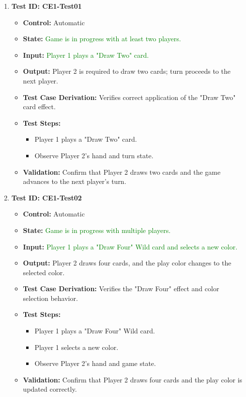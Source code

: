 \documentclass[12pt]{article}
\newcommand{\added}[1]{\textcolor{green}{#1}}
\begin{document}
\begin{enumerate}
    \item \textbf{Test ID: CE1-Test01}
    \begin{itemize}
        \item \textbf{Control:} Automatic
        \item \textbf{State:} \added{Game is in progress with at least two players.}
        \item \textbf{Input:} \added{Player 1 plays a "Draw Two" card.}
        \item \textbf{Output:} Player 2 is required to draw two cards; turn proceeds to the next player.
        \item \textbf{Test Case Derivation:} Verifies correct application of the "Draw Two" card effect.
        \item \textbf{Test Steps:}
        \begin{itemize}
            \item Player 1 plays a "Draw Two" card.
            \item Observe Player 2's hand and turn state.
        \end{itemize}
        \item \textbf{Validation:} Confirm that Player 2 draws two cards and the game advances to the next player's turn.
    \end{itemize}

    \item \textbf{Test ID: CE1-Test02}
    \begin{itemize}
        \item \textbf{Control:} Automatic
        \item \textbf{State:} \added{Game is in progress with multiple players.}
        \item \textbf{Input:} \added{Player 1 plays a "Draw Four" Wild card and selects a new color.}
        \item \textbf{Output:} Player 2 draws four cards, and the play color changes to the selected color.
        \item \textbf{Test Case Derivation:} Verifies the "Draw Four" effect and color selection behavior.
        \item \textbf{Test Steps:}
        \begin{itemize}
            \item Player 1 plays a "Draw Four" Wild card.
            \item Player 1 selects a new color.
            \item Observe Player 2’s hand and game state.
        \end{itemize}
        \item \textbf{Validation:} Confirm that Player 2 draws four cards and the play color is updated correctly.
    \end{itemize}


\end{enumerate}
\end{document}
